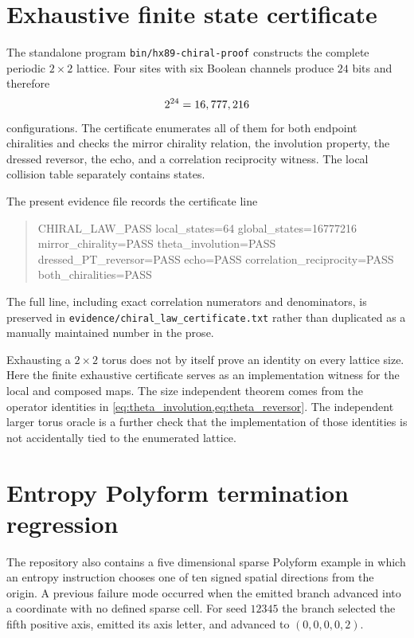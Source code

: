 \section{Exhaustive finite state certificate}
The standalone program \texttt{bin/hx89-chiral-proof} constructs the complete periodic $2\times2$ lattice. Four sites with six Boolean channels produce $24$ bits and therefore
\begin{equation}
 2^{24}=16,777,216{}
 \label{eq:global_state_count}
\end{equation}
configurations. The certificate enumerates all of them for both endpoint chiralities and checks the mirror chirality relation, the involution property, the dressed reversor, the echo, and a correlation reciprocity witness. The local collision table separately contains \HXLocalStates{} states.

The present evidence file records the certificate line
\begin{quote}\ttfamily
CHIRAL\_LAW\_PASS local\_states=64 global\_states=16777216 mirror\_chirality=PASS theta\_involution=PASS dressed\_PT\_reversor=PASS echo=PASS correlation\_reciprocity=PASS both\_chiralities=PASS
\end{quote}
The full line, including exact correlation numerators and denominators, is preserved in \texttt{evidence/chiral\_law\_certificate.txt} rather than duplicated as a manually maintained number in the prose.

Exhausting a $2\times2$ torus does not by itself prove an identity on every lattice size. Here the finite exhaustive certificate serves as an implementation witness for the local and composed maps. The size independent theorem comes from the operator identities in \cref{eq:theta_involution,eq:theta_reversor}. The independent larger torus oracle is a further check that the implementation of those identities is not accidentally tied to the enumerated lattice.

\section{Entropy Polyform termination regression}
The repository also contains a five dimensional sparse Polyform example in which an entropy instruction chooses one of ten signed spatial directions from the origin. A previous failure mode occurred when the emitted branch advanced into a coordinate with no defined sparse cell. For seed $12345$ the branch selected the fifth positive axis, emitted its axis letter, and advanced to $(0,0,0,0,2)$.


